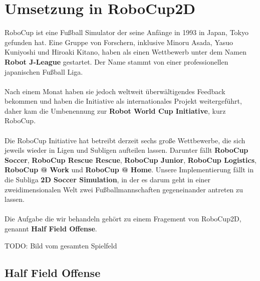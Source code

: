 \chapter{Umsetzung in RoboCup2D}
    RoboCup ist eine Fußball Simulator der seine Anfänge in 1993 in Japan, Tokyo gefunden hat. Eine Gruppe von Forschern, inklusive Minoru Asada, Yasuo Kuniyoshi und Hiroaki Kitano, haben als einen Wettbewerb unter dem Namen \textbf{Robot J-League} gestartet. Der Name stammt von einer professionellen japanischen Fußball Liga.\\
    \\
    Nach einem Monat haben sie jedoch weltweit überwältigendes Feedback bekommen und haben die Initiative als internationales Projekt weitergeführt, daher kam die Umbenennung zur \textbf{Robot World Cup Initiative}, kurz RoboCup. \\
    \\
    Die RoboCup Initiative hat betreibt derzeit sechs große Wettbewerbe, die sich jeweils wieder in Ligen und Subligen aufteilen lassen.
    Darunter fällt \textbf{RoboCup Soccer}, \textbf{RoboCup Rescue Rescue}, \textbf{RoboCup Junior}, \textbf{RoboCup Logistics}, \textbf{RoboCup @ Work} und \textbf{RoboCup @ Home}. Unsere Implementierung fällt in die Subliga \textbf{2D Soccer Simulation}, in der es darum geht in einer zweidimensionalen Welt zwei Fußballmannschaften gegeneinander antreten zu lassen.\\
    \\
    Die Aufgabe die wir behandeln gehört zu einem Fragement von RoboCup2D, genannt \textbf{Half Field Offense}.

    TODO: Bild vom gesamten Spielfeld

    \section{Half Field Offense}

